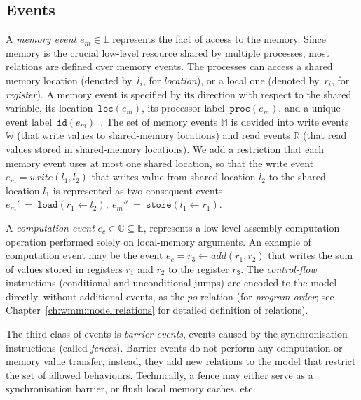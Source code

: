 \subsection{Events}
\label{ch:wmm:model:events}

A \textit{memory event} $e_m \in \mathbb{E}$ represents the fact of access to the memory. Since memory is the crucial low-level resource shared by multiple processes, most relations are defined over memory events. 
The processes can access a shared memory location (denoted by~$l_i$, for \textit{location}), or a local one (denoted by~$r_i$, for \textit{register}). A memory event is specified by its direction with respect to the shared variable, its location~$\texttt{loc}(e_m)$, its processor label~$\texttt{proc}(e_m)$, and a unique event label~$\texttt{id}(e_m)$~\cite{alglave2010shared}. 
The set of memory events $\mathbb{M}$ is devided into write events $\mathbb{W}$ (that write values to shared-memory locations) and read events $\mathbb{R}$ (that read values stored in shared-memory locations).
We add a restriction that each memory event uses at most one shared location, so that the write event $e_m = write(l_1, l_2)$ that writes value from shared location $l_2$ to the shared location $l_1$ is represented as two consequent events $e_m'~=~\texttt{load}(r_1 \leftarrow l_2); \ e_m''~=~\texttt{store}(l_1 \leftarrow r_1)$.

A \textit{computation event} $e_c \in \mathbb{C} \subseteq \mathbb{E}$, represents a low-level assembly computation operation performed solely on local-memory arguments. An example of computation event may be the event $e_c = r_3 \leftarrow add(r_1, r_2)$ that writes the sum of values stored in registers $r_1$ and $r_2$ to the register $r_3$. The \textit{control-flow} instructions (conditional and unconditional jumps) are encoded to the model directly, without additional events, as the $po$-relation (for \textit{program order}; see Chapter~\ref{ch:wmm:model:relations} for detailed definition of relations).

The third class of events is \textit{barrier events}, events caused by the synchronisation instructions (called \textit{fences}). Barrier events do not perform any computation or memory value transfer, instead, they add new relations to the model that restrict the set of allowed behaviours. Technically, a fence may either serve as a synchronisation barrier, or flush local memory caches, etc.


